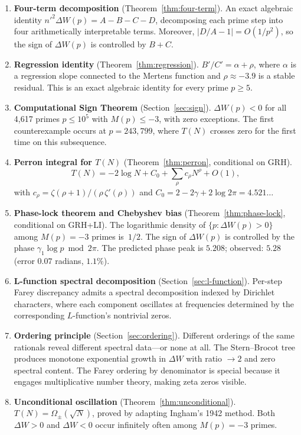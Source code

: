 \documentclass[11pt]{article}
\theoremstyle{definition}
\begin{document}
\begin{enumerate}[(1)]
  \item \textbf{Four-term decomposition} (Theorem~\ref{thm:four-term}).
    An exact algebraic identity
    $n'^2 \Delta W(p) = A - B - C - D$,
    decomposing each prime step into four arithmetically interpretable
    terms.  Moreover, $|D/A - 1| = O(1/p^2)$, so the sign of
    $\Delta W(p)$ is controlled by $B + C$.

  \item \textbf{Regression identity} (Theorem~\ref{thm:regression}).
    $B'/C' = \alpha + \rho$,
    where $\alpha$ is a regression slope connected to the Mertens
    function and $\rho \approx -3.9$ is a stable residual.  This
    is an exact algebraic identity for every prime $p \ge 5$.

  \item \textbf{Computational Sign Theorem} (Section~\ref{sec:sign}).
    $\Delta W(p) < 0$ for all 4{,}617 primes $p \le 10^5$ with
    $M(p) \le -3$, with zero exceptions.  The first counterexample
    occurs at $p = 243{,}799$, where $T(N)$ crosses zero for the
    first time on this subsequence.

  \item \textbf{Perron integral for $T(N)$}
    (Theorem~\ref{thm:perron}, conditional on GRH).
    \[
      T(N) = -2\log N + C_0 + \sum_\rho c_\rho N^\rho + O(1),
    \]
    with $c_\rho = \zeta(\rho+1)/(\rho\,\zeta'(\rho))$ and
    $C_0 = 2 - 2\gamma + 2\log 2\pi = 4.521\ldots$

  \item \textbf{Phase-lock theorem and Chebyshev bias}
    (Theorem~\ref{thm:phase-lock}, conditional on GRH+LI).
    The logarithmic density of $\{p : \Delta W(p) > 0\}$
    among $M(p) = -3$ primes is~$1/2$.  The sign of $\Delta W(p)$
    is controlled by the phase $\gamma_1 \log p \bmod 2\pi$.
    The predicted phase peak is $5.208$; observed: $5.28$
    (error $0.07$ radians, $1.1\%$).

  \item \textbf{L-function spectral decomposition}
    (Section~\ref{sec:l-function}).
    Per-step Farey discrepancy admits a spectral decomposition indexed
    by Dirichlet characters, where each component oscillates at
    frequencies determined by the corresponding $L$-function's
    nontrivial zeros.

  \item \textbf{Ordering principle} (Section~\ref{sec:ordering}).
    Different orderings of the same rationals reveal different
    spectral data---or none at all.  The Stern--Brocot tree produces
    monotone exponential growth in $\Delta W$ with ratio $\to 2$
    and zero spectral content.  The Farey ordering by denominator
    is special because it engages multiplicative number theory,
    making zeta zeros visible.

  \item \textbf{Unconditional oscillation}
    (Theorem~\ref{thm:unconditional}).
    $T(N) = \Omega_\pm(\sqrt{N})$, proved by adapting Ingham's 1942
    method.  Both $\Delta W > 0$ and $\Delta W < 0$ occur infinitely
    often among $M(p) = -3$ primes.
\end{enumerate}
\end{document}
